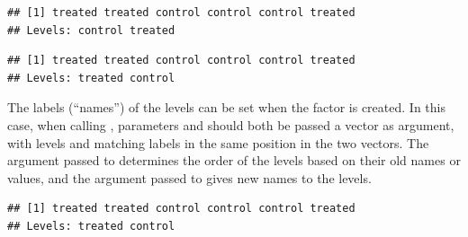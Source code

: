 \documentclass[krantz2]{krantz}\usepackage{knitr}
\begin{document}
\begin{knitrout}\footnotesize
{}\color{fgcolor}\begin{kframe}
\begin{alltt}
 \hlkwb{<-} \hlstd{(}\hlstd{,} \hlstd{,} \hlstd{,} \hlstd{,} \hlstd{,} \hlstd{)}
 \hlkwb{<-} 
\end{alltt}
\begin{verbatim}
## [1] treated treated control control control treated
## Levels: control treated
\end{verbatim}
\begin{alltt}
 \hlkwb{<-} \hlstd{(}   \hlstd{=} \hlstd{(}\hlstd{,} \hlstd{))}
\end{alltt}
\begin{verbatim}
## [1] treated treated control control control treated
## Levels: treated control
\end{verbatim}
\end{kframe}
\end{knitrout}

The labels (``names'') of the levels can be set when the factor is created. In this case, when calling , parameters  and  should both be passed a vector as argument, with levels and matching labels in the same position in the two vectors. The argument passed to  determines the order of the levels based on their old names or values, and the argument passed to  gives new names to the levels.

\begin{knitrout}\footnotesize
{}\color{fgcolor}\begin{kframe}
\begin{alltt}
 \hlkwb{<-} \hlstd{(}\hlstd{,} \hlstd{,} \hlstd{,} \hlstd{,} \hlstd{,} \hlstd{)}
 \hlkwb{<-} \hlstd{(}   \hlstd{=} \hlstd{(}\hlstd{,} \hlstd{),}  \hlstd{=} \hlstd{(}\hlstd{,} \hlstd{))}
\end{alltt}
\begin{verbatim}
## [1] treated treated control control control treated
## Levels: treated control
\end{verbatim}
\end{kframe}
\end{knitrout}
\end{document}
